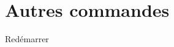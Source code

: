 \documentclass[a4paper,french,12pt]{article}
\begin{document}
\section*{Autres commandes}
\begin{multicols}{2}
  \begin{labeling}{Redémarrer}
  \item[Redémarrer] \keys{*}~~~~
  \item[Arrêter]    \keys{*}~~~~
  \item[Mode démo]  \keys{*}~~~~
  \end{labeling}
\end{multicols}
\end{document}
